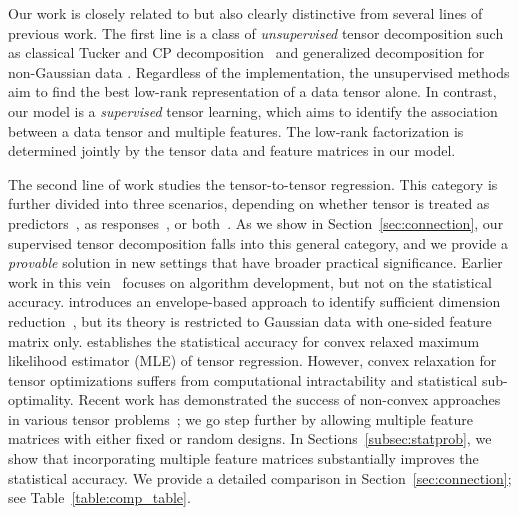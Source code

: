 \documentclass[12pt]{article}
\theoremstyle{definition}
\theoremstyle{definition}
\begin{document}
 
Our work is closely related to but also clearly distinctive from several lines of previous work. {The first line is a class of}\label{change:firstline} \textit{unsupervised} tensor decomposition such as classical Tucker and CP decomposition~\citep{de2000multilinear, kolda2009tensor} and generalized decomposition for non-Gaussian data \citep{chi2012tensors, tarzanagh2019regularized,hong2020generalized,  li2020generalized}. {\color{blue}Regardless of the implementation, the unsupervised methods aim to find the best low-rank representation of a data tensor alone. In contrast, our model is a \textit{supervised} tensor learning, which aims to identify the association between a data tensor and multiple features. The low-rank factorization is determined jointly by the tensor data and feature matrices in our model.}

The second line of work studies the tensor-to-tensor regression. {\color{blue}This category is further divided into three scenarios, depending on whether tensor is treated as predictors~\citep{zhou2013tensor,raskutti2019convex,han2020optimal}, as responses~\citep{li2017parsimonious,sun2017store,zhang2018network,lock2018supervised,luo2018leveraging}, or both~\citep{lock2018tensor,gahrooei2020multiple}. As we show in Section~\ref{sec:connection}, our supervised tensor decomposition falls into this general category, and we provide a \emph{provable} solution in new settings that have broader practical significance. Earlier work in this vein~\citep{lock2018tensor,lock2018supervised,gahrooei2020multiple,li2020generalized} focuses on algorithm development, but not on the statistical accuracy. \cite{li2017parsimonious} introduces an envelope-based approach to identify sufficient dimension reduction~\citep{adragni2009sufficient}, but its theory is restricted to Gaussian data with one-sided feature matrix only. \cite{raskutti2019convex} establishes the statistical accuracy for convex relaxed maximum likelihood estimator (MLE) of tensor regression. However, convex relaxation for tensor optimizations suffers from computational intractability and statistical sub-optimality. Recent work has demonstrated the success of non-convex approaches in various tensor problems~\citep{sun2017store,zhang2018network,raskutti2019convex,han2020optimal}; we go step further by allowing multiple feature matrices with either fixed or random designs. In Sections~\ref{subsec:statprob}, we show that incorporating multiple feature matrices substantially improves the statistical accuracy. We provide a detailed comparison in Section~\ref{sec:connection}; see Table~\ref{table:comp_table}.}
\end{document}
